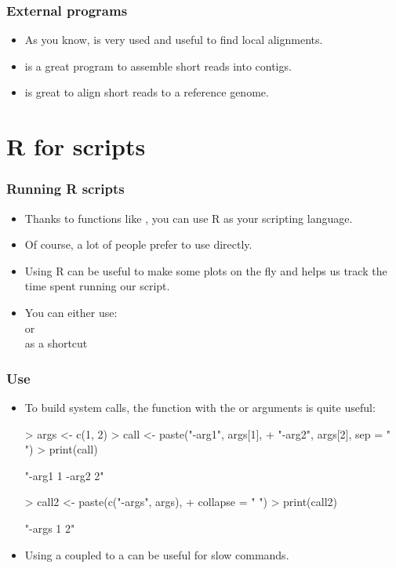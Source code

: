 \begin{frame}[allowframebreaks]
  \frametitle{External programs}
  \begin{itemize}
  \item As you know,  is \alert{very} used and useful to find local alignments.
  \item {} is a great program to assemble short reads into contigs.
  \item {} is great to align short reads to a reference genome.
  \end{itemize}
\end{frame}

\section{R for scripts}
\begin{frame}
  \frametitle{Running R scripts}
  \begin{itemize}
  \item Thanks to functions like , you can use R as your scripting language.
  \item Of course, a lot of people prefer to use  directly.
  \item Using R can be useful to make some plots on the fly and  helps us track the time spent running our script.
  \item You can either use: \\  or \\  as a shortcut
  \end{itemize}
\end{frame}

\begin{frame}
  \frametitle{Use }
  \begin{itemize}
  \item To build system calls, the  function with the  or  arguments is quite useful:
\begin{Schunk}
\begin{Sinput}
> args <- c(1, 2)
> call <- paste("-arg1", args[1], 
+     "-arg2", args[2], sep = " ")
> print(call)
\end{Sinput}
\begin{Soutput}
[1] "-arg1 1 -arg2 2"
\end{Soutput}
\begin{Sinput}
> call2 <- paste(c("-args", args), 
+     collapse = " ")
> print(call2)
\end{Sinput}
\begin{Soutput}
[1] "-args 1 2"
\end{Soutput}
\end{Schunk}
  \item Using a  coupled to a  can be useful for \alert{slow} commands.
  \end{itemize}
\end{frame}


